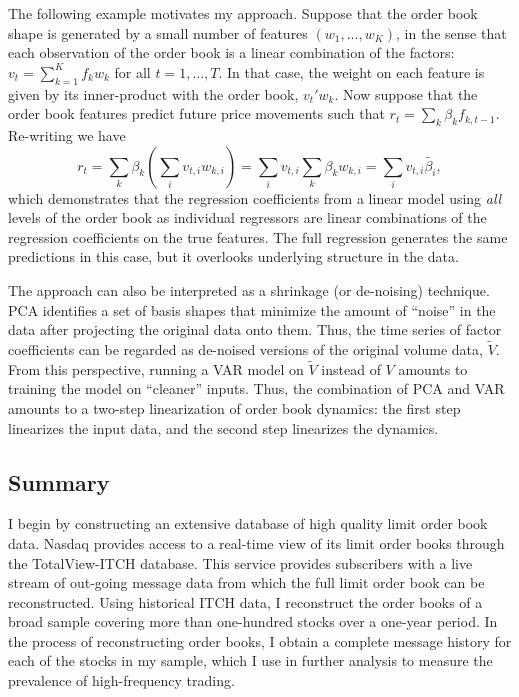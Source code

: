 The following example motivates my approach. Suppose that the order book shape is generated by a small number of features $(w_1, \dots, w_K)$, in the sense that each observation of the order book is a linear combination of the factors: $v_t = \sum_{k=1}^K f_k w_k$ for all $t = 1, \dots, T$. In that case, the weight on each feature is given by its inner-product with the order book, $v_t'w_k$. Now suppose that the order book features predict future price movements such that $r_t = \sum_k \beta_k f_{k, t - 1}.$ Re-writing we have $$ r_t = \sum_k \beta_k \left( \sum_i v_{t, i} w_{k, i} \right) = \sum_i v_{t,i} \sum_k \beta_k w_{k, i} = \sum_i v_{t,i} \tilde{\beta_i},$$ which demonstrates that the regression coefficients from a linear model using \textit{all} levels of the order book as individual regressors are linear combinations of the regression coefficients on the true features. The full regression generates the same predictions in this case, but it overlooks underlying structure in the data.

The approach can also be interpreted as a shrinkage (or de-noising) technique. PCA identifies a set of basis shapes that minimize the amount of ``noise'' in the data after projecting the original data onto them. Thus, the time series of factor coefficients can be regarded as de-noised versions of the original volume data, $\tilde{V}$. From this perspective, running a VAR model on $\tilde{V}$ instead of $V$ amounts to training the model on ``cleaner'' inputs. Thus, the combination of PCA and VAR amounts to a two-step linearization of order book dynamics: the first step linearizes the input data, and the second step linearizes the dynamics.


\subsection{Summary}
I begin by constructing an extensive database of high quality limit order book data. Nasdaq provides access to a real-time view of its limit order books through the TotalView-ITCH database. This service provides subscribers with a live stream of out-going message data from which the full limit order book can be reconstructed. Using historical ITCH data, I reconstruct the order books of a broad sample covering more than one-hundred stocks over a one-year period. In the process of reconstructing order books, I obtain a complete message history for each of the stocks in my sample, which I use in further analysis to measure the prevalence of high-frequency trading.

